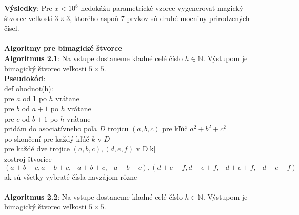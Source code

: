 \documentclass[12pt]{article}
\begin{document}
\textbf{Výsledky}: Pre $x < 10^8$ nedokážu parametrické vzorce vygenerovať magický štvorec veľkosti $3 \times 3$, ktorého aspoň $7$ prvkov sú druhé mocniny prirodzených čísel. \\\\

\textbf{Algoritmy pre bimagické štvorce} \\

\textbf{Algoritmus 2.1}: Na vstupe dostaneme kladné celé číslo $h \in \mathbb{N}$. Výstupom je bimagický štvorec veľkosti $5 \times 5$. \\

\textbf{Pseudokód}: \\
def ohodnot(h): \\
pre $a$ od $1$ po $h$ vrátane \\
pre $b$ od $a+1$ po $h$ vrátane \\
pre $c$ od $b+1$ po $h$ vrátane \\
pridám do asociatívneho poľa $D$ trojicu $(a,b,c)$ pre kľúč $a^2+b^2+c^2$ \\
po skončení pre každý kľúč $k$ v $D$ \\
pre každé dve trojice $(a,b,c), (d,e,f)$ v D[k] \\
zostroj štvorice $(a+b-c, a-b+c, -a+b+c, -a-b-c), (d+e-f, d-e+f, -d+e+f, -d-e-f)$ \\
ak sú všetky vybraté čísla navzájom rôzne \\\\

\textbf{Algoritmus 2.2}: Na vstupe dostaneme kladné celé číslo $h \in \mathbb{N}$. Výstupom je bimagický štvorec veľkosti $5 \times 5$. \\
\end{document}
